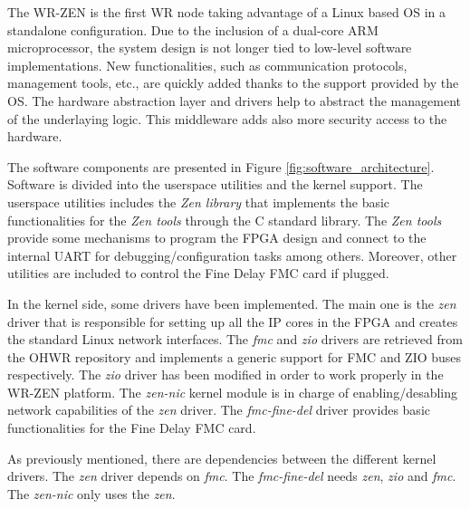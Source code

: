 The WR-ZEN is the first WR node taking advantage of a Linux based OS in a standalone configuration.  
Due to the inclusion of a dual-core ARM microprocessor, the system design is not longer tied to low-level software implementations. New functionalities, such as communication protocols, management tools, etc., are quickly added thanks to the support provided by the OS. The hardware abstraction layer and drivers help to abstract the management of the underlaying logic. This middleware adds also more security access to the hardware.

The software components are presented in Figure
\ref{fig:software_architecture}. Software is divided into the userspace utilities and the kernel support. The userspace utilities includes the \textit{Zen library} that implements the basic functionalities for the \textit{Zen tools} through the C standard library. The \textit{Zen tools} provide some mechanisms to program the FPGA design and connect to the internal UART for debugging/configuration tasks among others.  Moreover, other utilities are included to control the Fine Delay FMC card if plugged.

In the kernel side, some drivers have been implemented. The main one is the
\textit{zen} driver that is responsible for setting up all the IP cores in the
FPGA and creates the standard Linux network interfaces. The \textit{fmc} and
\textit{zio} drivers are retrieved from the OHWR repository and implements a
generic support for FMC and ZIO buses respectively.  The \textit{zio} driver
has been modified in order to work properly in the WR-ZEN platform.  The
\textit{zen-nic} kernel module is in charge of enabling/desabling network
capabilities of the \textit{zen} driver. The \textit{fmc-fine-del} driver
provides basic functionalities for the Fine Delay FMC card.

As previously mentioned, there are dependencies between the different kernel
drivers. The \textit{zen} driver depends
on \textit{fmc}. The \textit{fmc-fine-del} needs \textit{zen}, \textit{zio} and
\textit{fmc}. The \textit{zen-nic} only uses the \textit{zen}.

